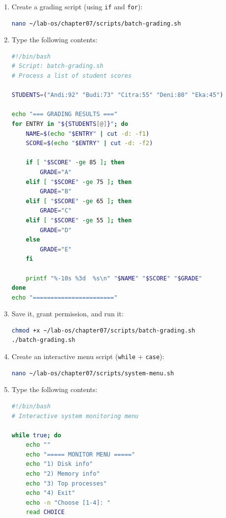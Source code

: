 \begin{enumerate}
  \item Create a grading script (using \texttt{if} and \texttt{for}):
\begin{lstlisting}[language=bash, caption={Creating batch-grading.sh}]
nano ~/lab-os/chapter07/scripts/batch-grading.sh
\end{lstlisting}

  \item Type the following contents:
\begin{lstlisting}[language=bash, caption={Contents of batch-grading.sh}]
#!/bin/bash
# Script: batch-grading.sh
# Process a list of student scores

STUDENTS=("Andi:92" "Budi:73" "Citra:55" "Deni:80" "Eka:45")

echo "=== GRADING RESULTS ==="
for ENTRY in "${STUDENTS[@]}"; do
    NAME=$(echo "$ENTRY" | cut -d: -f1)
    SCORE=$(echo "$ENTRY" | cut -d: -f2)

    if [ "$SCORE" -ge 85 ]; then
        GRADE="A"
    elif [ "$SCORE" -ge 75 ]; then
        GRADE="B"
    elif [ "$SCORE" -ge 65 ]; then
        GRADE="C"
    elif [ "$SCORE" -ge 55 ]; then
        GRADE="D"
    else
        GRADE="E"
    fi

    printf "%-10s %3d  %s\n" "$NAME" "$SCORE" "$GRADE"
done
echo "======================="
\end{lstlisting}

  \item Save it, grant permission, and run it:
\begin{lstlisting}[language=bash, caption={Running the grading script}]
chmod +x ~/lab-os/chapter07/scripts/batch-grading.sh
./batch-grading.sh
\end{lstlisting}

  \item Create an interactive menu script (\texttt{while} + \texttt{case}):
\begin{lstlisting}[language=bash, caption={Creating system-menu.sh}]
nano ~/lab-os/chapter07/scripts/system-menu.sh
\end{lstlisting}

  \item Type the following contents:
\begin{lstlisting}[language=bash, caption={Contents of system-menu.sh}]
#!/bin/bash
# Interactive system monitoring menu

while true; do
    echo ""
    echo "===== MONITOR MENU ====="
    echo "1) Disk info"
    echo "2) Memory info"
    echo "3) Top processes"
    echo "4) Exit"
    echo -n "Choose [1-4]: "
    read CHOICE


\end{lstlisting}
\end{enumerate}

